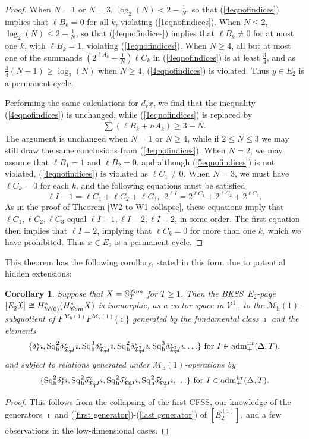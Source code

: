 \documentclass[11pt]{amsart} \renewcommand{\baselinestretch}{1.2}
\theoremstyle{plain}
\newtheorem{cor}[thm]{Corollary}
\numberwithin{equation}{section} %
\theoremstyle{plain}
\newtheorem{cor}[thm]{Corollary}
\numberwithin{equation}{chapter} %
\newcommand{\scrC}{\mathscr{C}}
\newcommand{\calV}{\mathcal{V}}
\newcommand{\calw}{\mathcal{W}}
\newcommand{\calx}{\mathcal{X}}
\newcommand{\calMv}{\mathcal{M}\dver}
\newcommand{\calMh}{\mathcal{M}\dhor}
\newcommand{\vect}[2]{\calV^{#1}_{#2}}
\newcommand{\aDTirr}{\mathrm{adm}_+^\mathrm{irr}(\Delta,T)}
\newcommand{\algs}{{\scrC\!\textit{\normalfont\textit{om}}}}
\newcommand{\TOP}{\mathfrak{T}}
\newcommand{\E}[5]{[E^{#1}_{#2}#3]^{#4}_{#5}}
\newcommand{\uver}{^\mathrm{v}}
\newcommand{\dver}{_\mathrm{v}}
\newcommand{\dhor}{_\mathrm{h}}
\newcommand{\Sqh}{\mathrm{Sq}\dhor}
\newcommand{\deltav}{\delta\uver}
\newcommand{\BKSS}{BKSS}
\newcommand{\CFSS}{CFSS}
\begin{document}
\begin{Calculations of HWn}
\begin{proof}
When $N=1$ or $N=3$, $\log_2(N)<2-\frac{1}{N}$, so that (\ref{4eqnofindices}) implies that $\ell B_k=0$ for all $k$, violating (\ref{1eqnofindices}).
When $N\leq2$, $\log_2(N)\leq 2-\frac{1}{N}$, so that (\ref{4eqnofindices}) implies that $\ell B_k\neq0$ for at most one $k$, with $\ell B_k=1$, violating (\ref{1eqnofindices}).
When $N\geq4$, all but at most one of the summands $(2^{\ell A_k}-\frac{1}{N})\ell C_k$ in (\ref{4eqnofindices}) is at least $\frac{3}{4}$, and as $\frac{3}{4}(N-1)\geq\log_2(N)$ when $N\geq4$, (\ref{4eqnofindices}) is violated. Thus $y\in E_2$ is a permanent cycle.

Performing the same calculations for $d_rx$, we find that the inequality (\ref{4eqnofindices}) is unchanged, while (\ref{1eqnofindices}) is replaced by
\begin{gather}
\textstyle \sum(\ell B_k+nA_k)\geq3-N.\label{5eqnofindices}\end{gather}
The argument is unchanged when $N=1$ or $N\geq4$, while if $2\leq N\leq3$ we may still draw the same conclusions from (\ref{4eqnofindices}). When $N=2$, we may assume that $\ell B_1=1$ and $\ell B_2=0$, and although (\ref{5eqnofindices}) is not violated, (\ref{4eqnofindices}) is violated as $\ell C_1\neq0$. When $N=3$, we must have $\ell C_k=0$ for each $k$, and the following equations must be satisfied
\[\ell I-1=\ell C_1+\ell C_2+\ell C_3,\ \  2^{\ell I}=2^{\ell C_1}+2^{\ell C_2}+2^{\ell C_3}.\]
As in the proof of Theorem \ref{W2 to W1 collapse}, these equations imply that $\ell C_1,\ell C_2,\ell C_3$ equal $\ell I-1,\ell I-2,\ell I-2$, in some order. The first equation then implies that $\ell I=2$, implying that $\ell C_k=0$ for more than one $k$, which we have prohibited. Thus $x\in E_2$ is a permanent cycle.
\end{proof}
This theorem has the following corollary, stated in this form due to potential hidden extensions:
\begin{cor}
\label{the corollary on the bousfield kan e2}
Suppose that $X=\mathbb{S}_{T}^{\algs}$ for $T\geq1$. Then the \BKSS\ $E_2$-page $\E{}{2}{\calx}{}{}\cong H^*_{\calw(0)}(H^*_\algs X)$ is isomorphic, as a vector space in $\vect{1}{+}$, to the $\calMh(1)$-subquotient of $F^{\calMh(1)}F^{\calMv(1)}\{\imath\}$ generated by 
the fundamental class $\imath$ and the elements
\[
\{\deltav_{I}\imath,
\Sqh^2\deltav_{\TOP_T^1\!I}\imath,\Sqh^3\deltav_{\TOP_T^1\!I}\imath,
\Sqh^2\deltav_{\TOP_T^2\!I}\imath,\Sqh^3\deltav_{\TOP_T^2\!I}\imath,
\ldots\}\textup{ for $I\in\aDTirr$,}
\]
and subject to  relations generated under $\calMh(1)$-operations by
\[\{
\Sqh^2\deltav_{I}\imath,
\Sqh^2\deltav_{\TOP_T^1\!I}\imath,
\Sqh^2\deltav_{\TOP_T^2\!I}\imath,
\Sqh^2\deltav_{\TOP_T^3\!I}\imath,
\ldots\}\textup{ for $I\in\aDTirr$.}
\]
\end{cor}
\begin{proof}
This follows from the collapsing of the first \CFSS, our knowledge of the generators $\imath$ and (\ref{first generator})-(\ref{last generator}) of $\E{(1)}{2}{}{}{}$, and  a few observations in the low-dimensional cases. 


\end{proof}
\end{Calculations of HWn}
\end{document}
